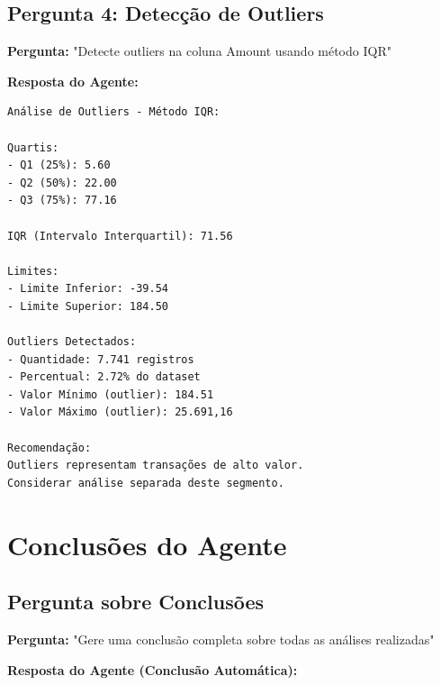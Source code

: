 \documentclass[12pt,a4paper]{article}
\begin{document}
\newpage
\subsection{Pergunta 4: Detecção de Outliers}

\textbf{Pergunta:} "Detecte outliers na coluna Amount usando método IQR"

\textbf{Resposta do Agente:}
\begin{verbatim}
Análise de Outliers - Método IQR:

Quartis:
- Q1 (25%): 5.60
- Q2 (50%): 22.00
- Q3 (75%): 77.16

IQR (Intervalo Interquartil): 71.56

Limites:
- Limite Inferior: -39.54
- Limite Superior: 184.50

Outliers Detectados:
- Quantidade: 7.741 registros
- Percentual: 2.72% do dataset
- Valor Mínimo (outlier): 184.51
- Valor Máximo (outlier): 25.691,16

Recomendação:
Outliers representam transações de alto valor.
Considerar análise separada deste segmento.
\end{verbatim}

\newpage
\section{Conclusões do Agente}

\subsection{Pergunta sobre Conclusões}

\textbf{Pergunta:} "Gere uma conclusão completa sobre todas as análises realizadas"

\textbf{Resposta do Agente (Conclusão Automática):}
\end{document}
